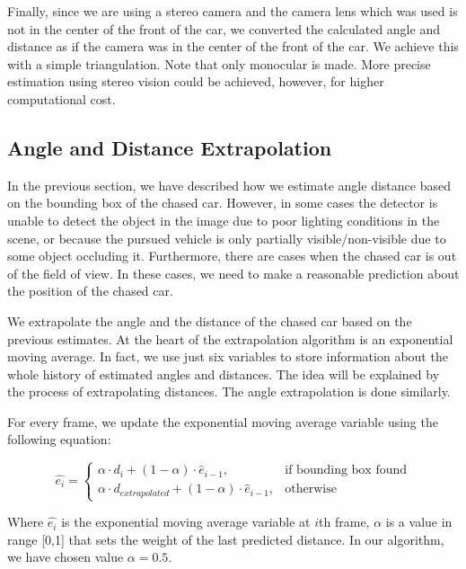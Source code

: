 \documentclass{ctuthesis/ctuthesis}
\begin{document}
Finally, since we are using a stereo camera and the camera lens which was used is not in the center of the front of the car, we converted the calculated angle and distance as if the camera was in the center of the front of the car. We achieve this with a simple triangulation. Note that only monocular is made. More precise estimation using stereo vision could be achieved, however, for higher computational cost.




\subsection{Angle and Distance Extrapolation}
In the previous section, we have described how we estimate angle distance based on the bounding box of the chased car. However, in some cases the detector is unable to detect the object in the image due to poor lighting conditions in the scene, or because the pursued vehicle is only partially visible/non-visible due to some object occluding it. Furthermore, there are cases when the chased car is out of the field of view. In these cases, we need to make a reasonable prediction about the position of the chased car. \par


We extrapolate the angle and the distance of the chased car based on the previous estimates. At the heart of the extrapolation algorithm is an exponential moving average. In fact, we use just six variables to store information about the whole history of estimated angles and distances. The idea will be explained by the process of extrapolating distances. The angle extrapolation is done similarly. \par


For every frame, we update the exponential moving average variable using the following equation:\par


\begin{equation}
    \hat{e_{i}}=
    \begin{cases}
      \alpha\cdot d_i + (1-\alpha)\cdot \hat{e}_{i-1}, & \text{if bounding box found} \\
      \alpha\cdot d_{extrapolated} + (1-\alpha)\cdot \hat{e}_{i-1}, & \text{otherwise}
    \end{cases}
\end{equation}

Where $\hat{e_{i}}$ is the exponential moving average variable at $i$th frame, $\alpha$ is a value in range [0,1] that sets the weight of the last predicted distance. In our algorithm, we have chosen value $\alpha=0.5$. \par
\end{document}
